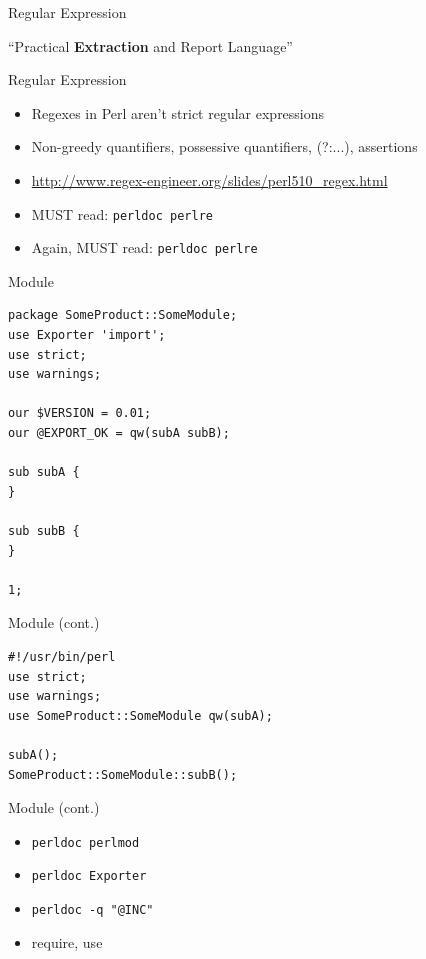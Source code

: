 \documentclass{beamer}
\begin{document}
\begin{frame}{Regular Expression}
  \begin{center}
    ``Practical {\bf Extraction} and Report Language''
  \end{center}
\end{frame}

\begin{frame}{Regular Expression}
  \begin{itemize}
    \item Regexes in Perl aren't strict regular expressions
    \item Non-greedy quantifiers, possessive quantifiers, (?:...), assertions
    \item \url{http://www.regex-engineer.org/slides/perl510_regex.html}
    \item MUST read: \texttt{perldoc perlre}
    \item Again, MUST read: \texttt{perldoc perlre}
  \end{itemize}
\end{frame}

\begin{frame}[containsverbatim]{Module}
\begin{lstlisting}[caption=A simple module]
package SomeProduct::SomeModule;
use Exporter 'import';
use strict;
use warnings;

our $VERSION = 0.01;
our @EXPORT_OK = qw(subA subB);

sub subA {
}

sub subB {
}

1;
\end{lstlisting}
\end{frame}

\begin{frame}[containsverbatim]{Module (cont.)}
\begin{lstlisting}[caption=Use module]
#!/usr/bin/perl
use strict;
use warnings;
use SomeProduct::SomeModule qw(subA);

subA();
SomeProduct::SomeModule::subB();
\end{lstlisting}
\end{frame}

\begin{frame}{Module (cont.)}
  \begin{itemize}
    \item \texttt{perldoc perlmod}
    \item \texttt{perldoc Exporter}
    \item \texttt{perldoc -q "@INC"}
    \item require, use
  \end{itemize}
\end{frame}
\end{document}
